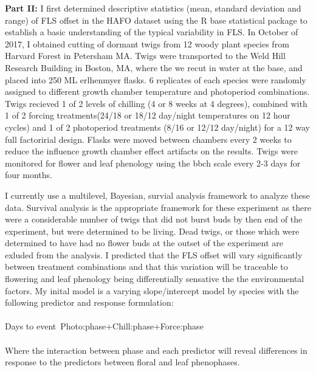 \documentclass{article}\usepackage[]{graphicx}\usepackage[]{color}
\begin{document}
{\textbf{Part II:} I first determined descriptive statistics (mean, standard deviation and range) of FLS offset in the HAFO dataset using the R base statistical package to establish a basic understanding of the typical variability in FLS. In October of 2017, I obtained cutting of dormant twigs from 12 woody plant species from Harvard Forest in Petersham MA. Twigs were transported to the Weld Hill Research Building in Boston, MA, where the we recut in water at the base, and placed into 250 ML erlhenmyer flasks. 6 replicates of each species were randomly assigned to different growth chamber temperature and photoperiod combinations. Twigs recieved 1 of 2 levels of chilling (4 or 8 weeks at 4 degrees), combined with 1 of 2 forcing treatments(24/18 or 18/12 day/night temperatures on 12 hour cycles) and 1 of 2 photoperiod treatments (8/16 or 12/12 day/night) for a 12 way full factoririal design. Flasks were moved between chambers every 2 weeks to reduce the influence growth chamber effect artifacts on the results. Twigs were monitored for flower and leaf phenology using the bbch scale \citep{Finn2007} every 2-3 days for four months.
\par I currently  use a multilevel, Bayesian, survial analysis framework to analyze these data. Survival analysis is the appropriate framework for these experiment as there were a considerable number of twigs that did not burst buds by then end of the experiment, but were determined to be living. Dead twigs, or those which were determined to have had no flower buds at the outset of the experiment are exluded from the analysis. I predicted that the FLS offset will vary significantly between treatment combinations and that this variation will be traceable to flowering and leaf phenology being differentially sensative the the environmental factors. My inital model is a varying slope/intercept model by species with the following predictor and response formulation:\\
\\
Days to event~Photo:phase+Chill:phase+Force:phase\\
\\
Where the interaction between phase and each predictor will reveal differences in response to the predictors between floral and leaf phenophases.\\
}
\end{document}
